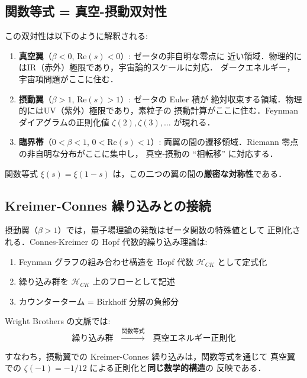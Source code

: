 \documentclass[11pt,a4paper]{article}
\begin{document}
\subsection{関数等式 = 真空-摂動双対性}

この双対性は以下のように解釈される:

\begin{enumerate}
\item \textbf{真空翼}（$\beta < 0$, Re$(s) < 0$）: ゼータの非自明な零点に
  近い領域．物理的にはIR（赤外）極限であり，宇宙論的スケールに対応．
  ダークエネルギー，宇宙項問題がここに住む．

\item \textbf{摂動翼}（$\beta > 1$, Re$(s) > 1$）: ゼータの Euler 積が
  絶対収束する領域．物理的にはUV（紫外）極限であり，素粒子の
  摂動計算がここに住む．Feynman ダイアグラムの正則化値
  $\zeta(2), \zeta(3), \ldots$ が現れる．

\item \textbf{臨界帯}（$0 < \beta < 1$, $0 < \text{Re}(s) < 1$）:
  両翼の間の遷移領域．Riemann 零点の非自明な分布がここに集中し，
  真空-摂動の ``相転移'' に対応する．
\end{enumerate}

関数等式 $\xi(s) = \xi(1-s)$ は，この二つの翼の間の\textbf{厳密な対称性}である．

\subsection{Kreimer-Connes 繰り込みとの接続}

摂動翼（$\beta > 1$）では，量子場理論の発散はゼータ関数の特殊値として
正則化される．Connes-Kreimer の Hopf 代数的繰り込み理論は:

\begin{enumerate}
\item Feynman グラフの組み合わせ構造を Hopf 代数 $\mathcal{H}_{CK}$ として定式化
\item 繰り込み群を $\mathcal{H}_{CK}$ 上のフローとして記述
\item カウンターターム = Birkhoff 分解の負部分
\end{enumerate}

Wright Brothers の文脈では:
\begin{equation}
\text{繰り込み群}\quad \xrightarrow{\text{関数等式}}\quad
\text{真空エネルギー正則化}
\end{equation}

すなわち，摂動翼での Kreimer-Connes 繰り込みは，関数等式を通じて
真空翼での $\zeta(-1) = -1/12$ による正則化と\textbf{同じ数学的構造}の
反映である．
\end{document}

